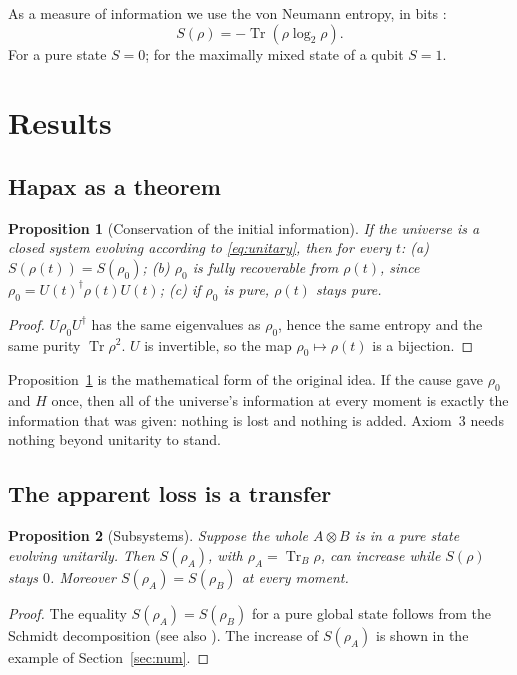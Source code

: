 \documentclass[a4paper,11pt]{article}
\newtheorem{prop}{Proposition}
\theoremstyle{definition}
\newcommand{\Tr}{\operatorname{Tr}}
\begin{document}
As a measure of information we use the von Neumann entropy, in bits \cite{vonneumann}:
\begin{equation}S(\rho)=-\Tr(\rho\log_2\rho).\end{equation}
 For a pure state $S=0$; for the maximally mixed state of a qubit $S=1$.

\section{Results}

\subsection{Hapax as a theorem}

\begin{prop}[Conservation of the initial information]\label{prop:apax}
If the universe is a closed system evolving according to \eqref{eq:unitary}, then for every $t$:
(a) $S(\rho(t))=S(\rho_0)$; (b) $\rho_0$ is fully recoverable from $\rho(t)$, since $\rho_0=U(t)^\dagger\rho(t)U(t)$; (c) if $\rho_0$ is pure, $\rho(t)$ stays pure.
\end{prop}
\begin{proof}
$U\rho_0U^\dagger$ has the same eigenvalues as $\rho_0$, hence the same entropy and the same purity $\Tr\rho^2$. $U$ is invertible, so the map $\rho_0\mapsto\rho(t)$ is a bijection.
\end{proof}

Proposition~\ref{prop:apax} is the mathematical form of the original idea. If the cause gave $\rho_0$ and $H$ once, then all of the universe's information at every moment is exactly the information that was given: nothing is lost and nothing is added. Axiom~3 needs nothing beyond unitarity to stand.

\subsection{The apparent loss is a transfer}

\begin{prop}[Subsystems]\label{prop:sub}
Suppose the whole $A\otimes B$ is in a pure state evolving unitarily. Then $S(\rho_A)$, with $\rho_A=\Tr_B\rho$, can increase while $S(\rho)$ stays $0$. Moreover $S(\rho_A)=S(\rho_B)$ at every moment.
\end{prop}
\begin{proof}
The equality $S(\rho_A)=S(\rho_B)$ for a pure global state follows from the Schmidt decomposition (see also \cite{arakilieb}). The increase of $S(\rho_A)$ is shown in the example of Section~\ref{sec:num}.
\end{proof}
\end{document}
